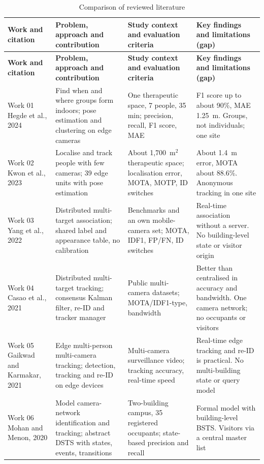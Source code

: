 \documentclass[12pt,a4paper,oneside]{report}
\begin{document}
{\footnotesize\setlength{\tabcolsep}{4pt}\renewcommand{\arraystretch}{1.25}
\begin{longtable}{|p{2.0cm}|p{3.8cm}|p{3.2cm}|p{5.1cm}|}
\caption{Comparison of reviewed literature}\label{tab:literature}\\\hline
\textbf{Work and citation} & \textbf{Problem, approach and contribution} & \textbf{Study context and evaluation criteria} & \textbf{Key findings and limitations (gap)}\\\hline\endfirsthead
\hline\textbf{Work and citation} & \textbf{Problem, approach and contribution} & \textbf{Study context and evaluation criteria} & \textbf{Key findings and limitations (gap)}\\\hline\endhead
Work 01 \cite{ref1} Hegde et al., 2024 & Find when and where groups form indoors; pose estimation and clustering on edge cameras & One therapeutic space, 7 people, 35 min; precision, recall, F1 score, MAE & F1 score up to about 90\%, MAE 1.25~m. Groups, not individuals; one site\\\hline
Work 02 \cite{ref2} Kwon et al., 2023 & Localise and track people with few cameras; 39 edge units with pose estimation & About 1,700~m$^2$ therapeutic space; localisation error, MOTA, MOTP, ID switches & About 1.4~m error, MOTA about 88.6\%. Anonymous tracking in one site\\\hline
Work 03 \cite{ref3} Yang et al., 2022 & Distributed multi-target association; shared label and appearance table, no calibration & Benchmarks and an own mobile-camera set; MOTA, IDF1, FP/FN, ID switches & Real-time association without a server. No building-level state or visitor origin\\\hline
Work 04 \cite{ref4} Casao et al., 2021 & Distributed multi-target tracking; consensus Kalman filter, re-ID and tracker manager & Public multi-camera datasets; MOTA/IDF1-type, bandwidth & Better than centralised in accuracy and bandwidth. One camera network; no occupants or visitors\\\hline
Work 05 \cite{ref5} Gaikwad and Karmakar, 2021 & Edge multi-person multi-camera tracking; detection, tracking and re-ID on edge devices & Multi-camera surveillance video; tracking accuracy, real-time speed & Real-time edge tracking and re-ID is practical. No multi-building state or query model\\\hline
Work 06 \cite{ref6} Mohan and Menon, 2020 & Model camera-network identification and tracking; abstract DSTS with states, events, transitions & Two-building campus, 35 registered occupants; state-based precision and recall & Formal model with building-level BSTS. Visitors via a central master list\\\hline

\end{longtable}}
\end{document}
